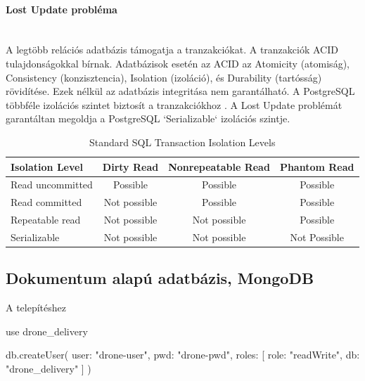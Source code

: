 

\paragraph{Lost Update probléma} \mbox{} \\
A legtöbb relációs adatbázis támogatja a tranzakciókat. A tranzakciók ACID tulajdonságokkal bírnak.
Adatbázisok esetén az ACID az Atomicity (atomiság), Consistency (konzisztencia), Isolation (izoláció), és Durability (tartósság) rövidítése. Ezek nélkül az adatbázis integritása nem garantálható.
A PostgreSQL többféle izolációs szintet biztosít a tranzakciókhoz \cite{postgres-transaction}. A Lost Update problémát garantáltan megoldja a PostgreSQL `Serializable` izolációs szintje.
\begin{table}[h]
    \centering
    \caption{ Standard SQL Transaction Isolation Levels}
    \begin{tabular}{l|c|c|c|}
Isolation Level & Dirty Read  & Nonrepeatable Read & Phantom Read\\
        \hline
Read uncommitted  & Possible & Possible & Possible \\
\hline
Read committed & Not possible & Possible & Possible \\
\hline
Repeatable read & Not possible & Not possible & Possible \\
\hline
Serializable & Not possible & Not possible & Not Possible \\
        \hline
    \end{tabular}
\end{table}

\subsection{Dokumentum alapú adatbázis, MongoDB}

A telepítéshez
\begin{python}
    use drone_delivery
\end{python}

\begin{python}

    db.createUser(
        {
        user: "drone-user",
        pwd: "drone-pwd",
        roles: [
            {
            role: "readWrite",
            db: "drone_delivery"
        }
        ]
    }
    )
\end{python}
